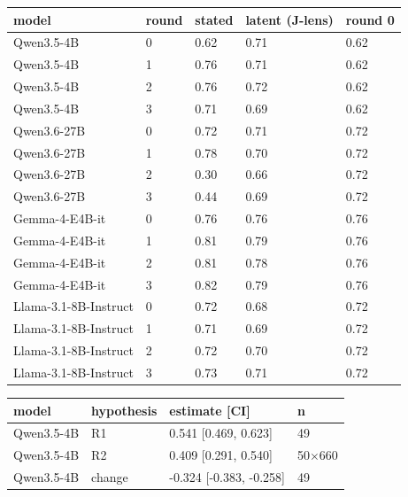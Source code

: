 \begin{tabular}{lllll}
\toprule
model & round & stated & latent (J-lens) & round 0 \\
\midrule
Qwen3.5-4B & 0 & 0.62 & 0.71 & 0.62 \\
Qwen3.5-4B & 1 & 0.76 & 0.71 & 0.62 \\
Qwen3.5-4B & 2 & 0.76 & 0.72 & 0.62 \\
Qwen3.5-4B & 3 & 0.71 & 0.69 & 0.62 \\
Qwen3.6-27B & 0 & 0.72 & 0.71 & 0.72 \\
Qwen3.6-27B & 1 & 0.78 & 0.70 & 0.72 \\
Qwen3.6-27B & 2 & 0.30 & 0.66 & 0.72 \\
Qwen3.6-27B & 3 & 0.44 & 0.69 & 0.72 \\
Gemma-4-E4B-it & 0 & 0.76 & 0.76 & 0.76 \\
Gemma-4-E4B-it & 1 & 0.81 & 0.79 & 0.76 \\
Gemma-4-E4B-it & 2 & 0.81 & 0.78 & 0.76 \\
Gemma-4-E4B-it & 3 & 0.82 & 0.79 & 0.76 \\
Llama-3.1-8B-Instruct & 0 & 0.72 & 0.68 & 0.72 \\
Llama-3.1-8B-Instruct & 1 & 0.71 & 0.69 & 0.72 \\
Llama-3.1-8B-Instruct & 2 & 0.72 & 0.70 & 0.72 \\
Llama-3.1-8B-Instruct & 3 & 0.73 & 0.71 & 0.72 \\
\bottomrule
\end{tabular}

\begin{tabular}{llll}
\toprule
model & hypothesis & estimate [CI] & n \\
\midrule
Qwen3.5-4B & R1 & 0.541 [0.469, 0.623] & 49 \\
Qwen3.5-4B & R2 & 0.409 [0.291, 0.540] & 50$\times$660 \\
Qwen3.5-4B & change & -0.324 [-0.383, -0.258] & 49 \\
\bottomrule
\end{tabular}
